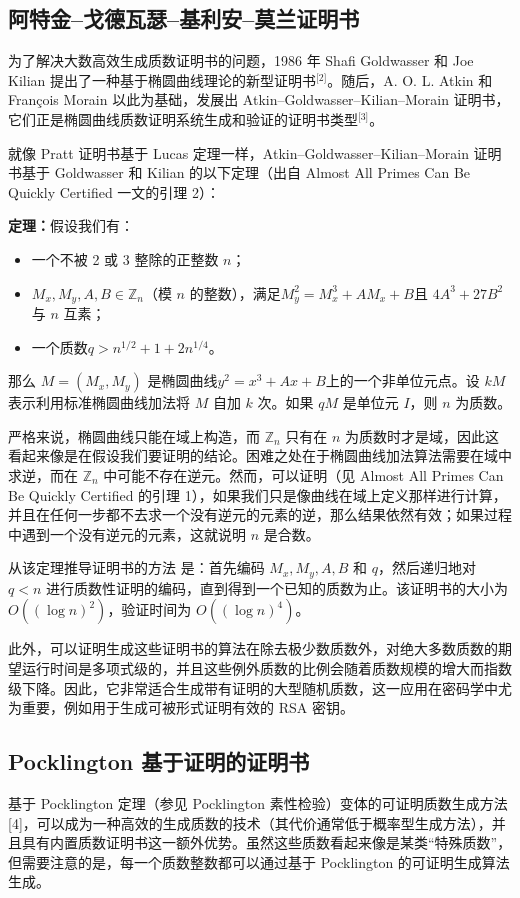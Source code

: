 \subsection{阿特金–戈德瓦瑟–基利安–莫兰证明书}
为了解决大数高效生成质数证明书的问题，1986 年 Shafi Goldwasser 和 Joe Kilian 提出了一种基于椭圆曲线理论的新型证明书\(^\text{[2]}\)。随后，A. O. L. Atkin 和 François Morain 以此为基础，发展出 Atkin–Goldwasser–Kilian–Morain 证明书，它们正是椭圆曲线质数证明系统生成和验证的证明书类型\(^\text{[3]}\)。

就像 Pratt 证明书基于 Lucas 定理一样，Atkin–Goldwasser–Kilian–Morain 证明书基于 Goldwasser 和 Kilian 的以下定理（出自 Almost All Primes Can Be Quickly Certified 一文的引理 2）：

\textbf{定理：}假设我们有：
\begin{itemize}
\item 一个不被 2 或 3 整除的正整数 $n$；
\item $M_x, M_y, A, B \in \mathbb{Z}_n$（模 $n$ 的整数），满足$M_y^2 = M_x^3 + A M_x + B$且 $4A^3 + 27B^2$ 与 $n$ 互素；
\item 一个质数$q > n^{1/2} + 1 + 2n^{1/4}$。
\end{itemize}
那么 $M = (M_x, M_y)$ 是椭圆曲线$y^2 = x^3 + A x + B$上的一个非单位元点。设 $kM$ 表示利用标准椭圆曲线加法将 $M$ 自加 $k$ 次。如果 $qM$ 是单位元 $I$，则 $n$ 为质数。

严格来说，椭圆曲线只能在域上构造，而 $\mathbb{Z}_n$ 只有在 $n$ 为质数时才是域，因此这看起来像是在假设我们要证明的结论。困难之处在于椭圆曲线加法算法需要在域中求逆，而在 $\mathbb{Z}_n$ 中可能不存在逆元。然而，可以证明（见 Almost All Primes Can Be Quickly Certified 的引理 1），如果我们只是像曲线在域上定义那样进行计算，并且在任何一步都不去求一个没有逆元的元素的逆，那么结果依然有效；如果过程中遇到一个没有逆元的元素，这就说明 $n$ 是合数。

从该定理推导证明书的方法 是：首先编码 $M_x, M_y, A, B$ 和 $q$，然后递归地对 $q < n$ 进行质数性证明的编码，直到得到一个已知的质数为止。该证明书的大小为 $O((\log n)^2)$，验证时间为 $O((\log n)^4)$。

此外，可以证明生成这些证明书的算法在除去极少数质数外，对绝大多数质数的期望运行时间是多项式级的，并且这些例外质数的比例会随着质数规模的增大而指数级下降。因此，它非常适合生成带有证明的大型随机质数，这一应用在密码学中尤为重要，例如用于生成可被形式证明有效的 RSA 密钥。
\subsection{Pocklington 基于证明的证明书}
基于 Pocklington 定理（参见 Pocklington 素性检验）变体的可证明质数生成方法[4]，可以成为一种高效的生成质数的技术（其代价通常低于概率型生成方法），并且具有内置质数证明书这一额外优势。虽然这些质数看起来像是某类“特殊质数”，但需要注意的是，每一个质数整数都可以通过基于 Pocklington 的可证明生成算法生成。

